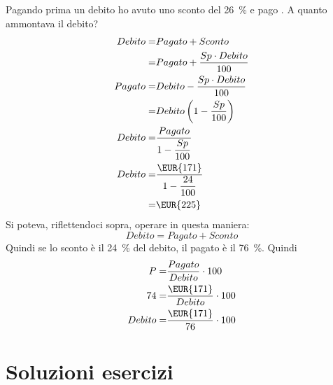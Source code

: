 \begin{exercise}
	Pagando prima un debito ho avuto uno sconto del  \SI{26}{\percent} e pago . A quanto ammontava il debito?
	\tcblower
	\begin{align*}
	Debito=&Pagato+Sconto\\
	=&Pagato+\dfrac{Sp\cdot Debito}{100}\\
	Pagato=&Debito-\dfrac{Sp\cdot Debito}{100}\\
	=&Debito\left(1-\dfrac{Sp}{100}\right)\\
	Debito=&\dfrac{Pagato}{1-\dfrac{Sp}{100}}\\
	Debito=&\dfrac{\mbox{\EUR{171}}}{1-\dfrac{24}{100}}\\
	=&\mbox{\EUR{225}}
	\end{align*}
Si poteva, riflettendoci sopra, operare in questa maniera:
\[Debito=Pagato+Sconto\]
Quindi se lo sconto è il \SI{24}{\percent} del debito, il pagato è il \SI{76}{\percent}. Quindi
\begin{align*}
	P=&\dfrac{Pagato}{Debito}\cdot100\\
	74=&\dfrac{\mbox{\EUR{171}}}{Debito}\cdot 100\\
	Debito=&\dfrac{\mbox{\EUR{171}}}{76}\cdot 100\\
\end{align*} 
\end{exercise}
\tcbstoprecording
\newpage
\section{Soluzioni esercizi}
\tcbinputrecords